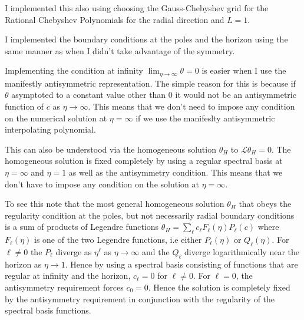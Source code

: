 \documentclass[aps,prd,amsmath,showpacs,amssymb,superscriptaddress,nofootinbib,longbibliography,eqsecnum,preprintnumbers]{revtex4-1}
\begin{document}
I implemented this also using choosing the Gauss-Chebyshev grid for the Rational Chebyshev Polynomials for the radial direction and $L=1$.

I implemented the boundary conditions at the poles and the horizon using the same manner as when I didn't take advantage of the symmetry.

Implementing the condition at infinity $\lim_{\eta\to \infty}\theta=0$ is easier when I use the manifestly antisymmetric representation. The simple reason for this is because if $\theta$ asymptoted to a constant value other than $0$ it would not be an antisymmetric function of $c$ as $\eta \to \infty$. This means that we don't need to impose any condition on the numerical solution at $\eta =\infty$ if we use the manifeslty antisymmetric interpolating polynomial.

This can also be understood via the homogeneous solution $\theta_H$ to $\mathcal L \theta_H=0$. The homogeneous solution is fixed completely by using a regular spectral basis at $\eta=\infty$ and $\eta=1$ as well as the antisymmetry condition. This means that we don't have to impose any condition on the solution at $\eta=\infty$. 

To see this note that the most general homogeneous solution $\theta_H$ that obeys the regularity condition at the poles, but not necessarily radial boundary conditions is a sum of products of Legendre functions $\theta_H =\sum_\ell c_\ell F_\ell(\eta)P_{\ell}(c)$ where $F_\ell(\eta)$ is one of the two Legendre functions, i.e either $P_\ell(\eta)$ or $Q_\ell(\eta)$. For $\ell \neq 0$ the $P_\ell$ diverge as $\eta^\ell$ as $\eta \to \infty$ and the $Q_\ell$ diverge logarithmically near the horizon as $\eta \to 1$. Hence by using a spectral basis consisting of functions that are regular at infinity and the horizon, $c_\ell=0$ for $\ell\neq 0$. For $\ell=0$, the antisymmetry requirement forces $c_0=0$. Hence the solution is completely fixed by the antisymmetry requirement in conjunction with the regularity of the spectral basis functions. 


\end{document}

